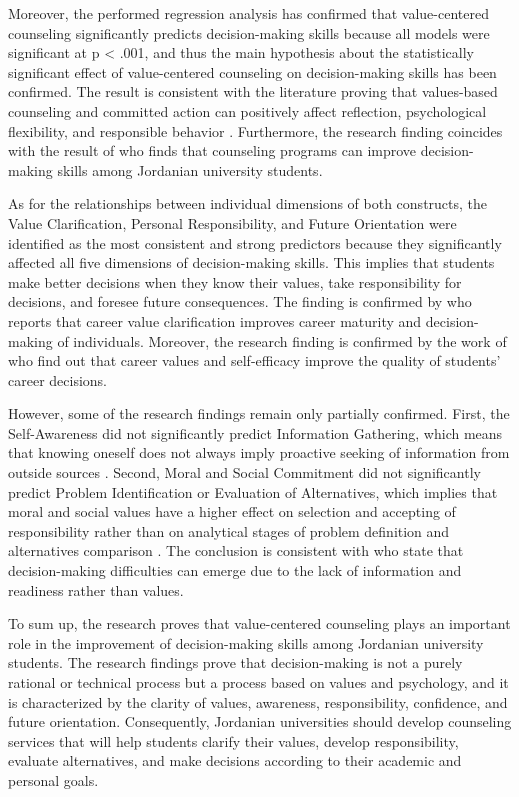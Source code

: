 \documentclass[10pt]{NSP1}
\begin{document}
Moreover, the performed regression analysis has confirmed that value-centered counseling significantly predicts decision-making skills because all models were significant at p \textless{} .001, and thus the main hypothesis about the statistically significant effect of value-centered counseling on decision-making skills has been confirmed. The result is consistent with the literature proving that values-based counseling and committed action can positively affect reflection, psychological flexibility, and responsible behavior \cite{ref23,ref25}. Furthermore, the research finding coincides with the result of \cite{ref34} who finds that counseling programs can improve decision-making skills among Jordanian university students.

As for the relationships between individual dimensions of both constructs, the Value Clarification, Personal Responsibility, and Future Orientation were identified as the most consistent and strong predictors because they significantly affected all five dimensions of decision-making skills. This implies that students make better decisions when they know their values, take responsibility for decisions, and foresee future consequences. The finding is confirmed by \cite{ref27} who reports that career value clarification improves career maturity and decision-making of individuals. Moreover, the research finding is confirmed by the work of \cite{ref28} who find out that career values and self-efficacy improve the quality of students' career decisions.

However, some of the research findings remain only partially confirmed. First, the Self-Awareness did not significantly predict Information Gathering, which means that knowing oneself does not always imply proactive seeking of information from outside sources \cite{ref39}. Second, Moral and Social Commitment did not significantly predict Problem Identification or Evaluation of Alternatives, which implies that moral and social values have a higher effect on selection and accepting of responsibility rather than on analytical stages of problem definition and alternatives comparison \cite{ref38}. The conclusion is consistent with \cite{ref18} who state that decision-making difficulties can emerge due to the lack of information and readiness rather than values.

To sum up, the research proves that value-centered counseling plays an important role in the improvement of decision-making skills among Jordanian university students. The research findings prove that decision-making is not a purely rational or technical process but a process based on values and psychology, and it is characterized by the clarity of values, awareness, responsibility, confidence, and future orientation. Consequently, Jordanian universities should develop counseling services that will help students clarify their values, develop responsibility, evaluate alternatives, and make decisions according to their academic and personal goals.
\end{document}
